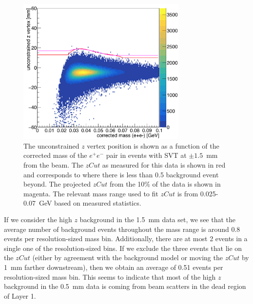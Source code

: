 \begin{figure}[htb]
  \centering
      \includegraphics[width=0.75\textwidth]{pics/results/zVm_1p5mm.png}
  \caption[Vertex position vs mass for the 100$\%$ L1L1 data at 1.5~mm]{The unconstrained $z$ vertex position is shown as a function of the corrected mass of the $e^+e^-$ pair in events with SVT at $\pm1.5$~mm from the beam. The $zCut$ as measured for this data is shown in red and corresponds to where there is less than 0.5 background event beyond. The projected $zCut$ from the 10$\%$ of the data is shown in magenta. The relevant mass range used to fit $zCut$ is from 0.025-0.07~GeV based on measured statistics.}
  \label{fig:zVm1p5_ub}
\end{figure} 

If we consider the high $z$ background in the 1.5~mm data set, we see that the average number of background events throughout the mass range is around 0.8 events per resolution-sized mass bin. Additionally, there are at most 2 events in a single one of the resolution-sized bins. If we exclude the three events that lie on the $zCut$ (either by agreement with the background model or moving the $zCut$ by 1~mm farther downstream), then we obtain an average of 0.51 events per resolution-sized mass bin. This seems to indicate that most of the high $z$ background in the 0.5~mm data is coming from beam scatters in the dead region of Layer 1.  